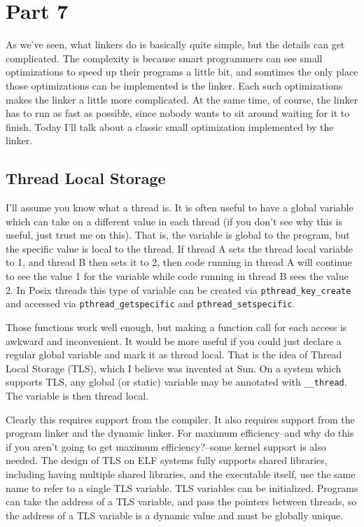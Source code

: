 \section{Part 7}

As we've seen, what linkers do is basically quite simple, but the details
can get complicated. The complexity is because smart programmers can see
small optimizations to speed up their programs a little bit, and somtimes the
only place those optimizations can be implemented is the linker. Each such
optimizations makes the linker a little more complicated. At the same time,
of course, the linker has to run as fast as possible, since nobody wants to
sit around waiting for it to finish. Today I'll talk about a classic small
optimization implemented by the linker.

\subsection{Thread Local Storage}

I'll assume you know what a thread is. It is often useful to have a global
variable which can take on a different value in each thread (if you don't see
why this is useful, just trust me on this). That is, the variable is global
to the program, but the specific value is local to the thread. If thread A
sets the thread local variable to 1, and thread B then sets it to 2, then
code running in thread A will continue to see the value 1 for the variable
while code running in thread B sees the value 2. In Posix threads this type
of variable can be created via \texttt{pthread\_key\_create} and accessed via
\texttt{pthread\_getspecific} and \texttt{pthread\_setspecific}.

Those functions work well enough, but making a function call for each access
is awkward and inconvenient. It would be more useful if you could just declare
a regular global variable and mark it as thread local. That is the idea of
Thread Local Storage (TLS), which I believe was invented at Sun. On a system
which supports TLS, any global (or static) variable may be annotated with
\texttt{\_\_thread}. The variable is then thread local.

Clearly this requires support from the compiler. It also requires support from
the program linker and the dynamic linker. For maximum efficiency--and why do
this if you aren't going to get maximum efficiency?--some kernel support is
also needed. The design of TLS on ELF systems fully supports shared libraries,
including having multiple shared libraries, and the executable itself, use the
same name to refer to a single TLS variable. TLS variables can be initialized.
Programs can take the address of a TLS variable, and pass the pointers between
threads, so the address of a TLS variable is a dynamic value and must be
globally unique.

